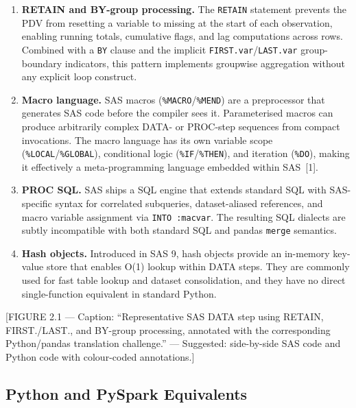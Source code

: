 \begin{enumerate}
  \item \textbf{RETAIN and BY-group processing.} The \texttt{RETAIN} statement
    prevents the PDV from resetting a variable to missing at the start of each
    observation, enabling running totals, cumulative flags, and lag computations
    across rows. Combined with a \texttt{BY} clause and the implicit
    \texttt{FIRST.var}/\texttt{LAST.var} group-boundary indicators, this
    pattern implements groupwise aggregation without any explicit loop
    construct.

  \item \textbf{Macro language.} SAS macros (\texttt{\%MACRO}/\texttt{\%MEND})
    are a preprocessor that generates SAS code before the compiler sees it.
    Parameterised macros can produce arbitrarily complex DATA- or PROC-step
    sequences from compact invocations. The macro language has its own variable
    scope (\texttt{\%LOCAL}/\texttt{\%GLOBAL}), conditional logic
    (\texttt{\%IF}/\texttt{\%THEN}), and iteration (\texttt{\%DO}), making it
    effectively a meta-programming language embedded within SAS~[1].

  \item \textbf{PROC SQL.} SAS ships a SQL engine that extends standard SQL
    with SAS-specific syntax for correlated subqueries, dataset-aliased
    references, and macro variable assignment via \texttt{INTO :macvar}.
    The resulting SQL dialects are subtly incompatible with both standard SQL
    and pandas \texttt{merge} semantics.

  \item \textbf{Hash objects.} Introduced in SAS 9, hash objects provide an
    in-memory key-value store that enables O(1) lookup within DATA steps. They
    are commonly used for fast table lookup and dataset consolidation, and
    they have no direct single-function equivalent in standard Python.
\end{enumerate}

[FIGURE 2.1 --- Caption: ``Representative SAS DATA step using RETAIN,
FIRST./LAST., and BY-group processing, annotated with the corresponding
Python/pandas translation challenge.'' --- Suggested: side-by-side SAS code
and Python code with colour-coded annotations.]

\subsection{Python and PySpark Equivalents}
\label{subsec:python-equivalents}

